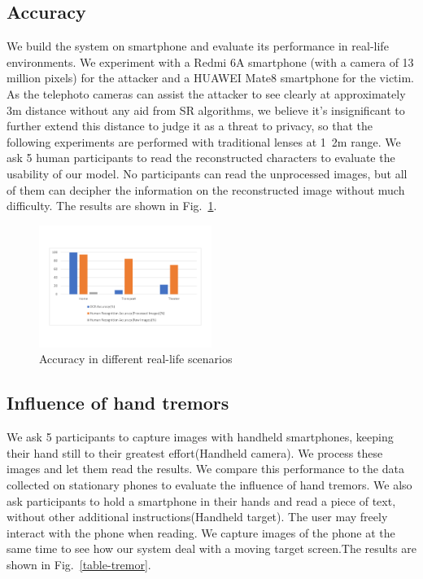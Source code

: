 \subsection{Accuracy}
We build the system on smartphone and evaluate its performance in real-life environments. We experiment with a Redmi 6A smartphone (with a camera of 13 million pixels) for the attacker and a HUAWEI Mate8 smartphone for the victim. As the telephoto cameras can assist the attacker to see clearly at approximately 3m distance without any aid from SR algorithms, we believe it's insignificant to further extend this distance to judge it as a threat to privacy, so that the following experiments are performed with traditional lenses at 1~2m range. We ask 5 human participants to read the reconstructed characters to evaluate the usability of our model. No participants can read the unprocessed images, but all of them can decipher the information on the reconstructed image without much difficulty. The results are shown in Fig.~\ref{table-accuracy}.

\begin{figure}
 \centering
    \includegraphics[width=0.5\textwidth]{./pic/table5.pdf}
    \caption{Accuracy in different real-life scenarios}
	\label{table-accuracy}
\end{figure}

\subsection{Influence of hand tremors}
We ask 5 participants to capture images with handheld smartphones, keeping their hand still to their greatest effort(Handheld camera). We process these images and let them read the results. We compare this performance to the data collected on stationary phones to evaluate the influence of hand tremors.
We also ask participants to hold a smartphone in their hands and read a piece of text, without other additional instructions(Handheld target). The user may freely interact with the phone when reading. We capture images of the phone at the same time to see how our system deal with a moving target screen.The results are shown in Fig.~\ref{table-tremor}.

